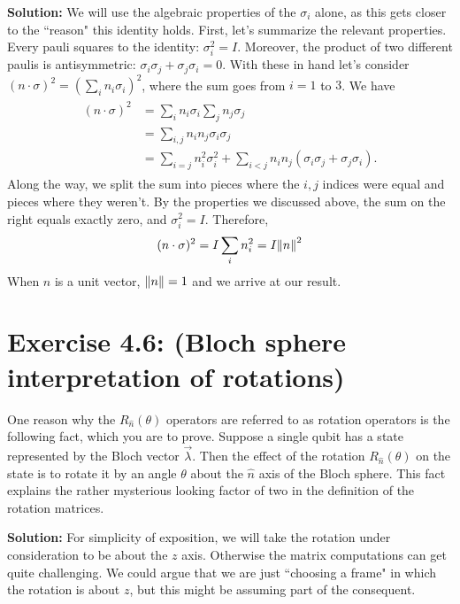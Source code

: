 \documentclass{book}
\begin{document}
    \textbf{Solution:} We will use the algebraic properties of the $\sigma_i$ alone, as this gets closer to the ``reason" this identity holds. First, let's summarize the relevant properties. Every pauli squares to the identity: $\sigma_i^2 = I$. Moreover, the product of two different paulis is antisymmetric: $\sigma_i \sigma_j +\sigma_j \sigma_i = 0$. With these in hand let's consider $(n\cdot \sigma)^2 = (\sum_i n_i \sigma_i)^2$, where the sum goes from $i = 1$ to $3$. We have
    \begin{align}
    \begin{aligned}
        (n\cdot \sigma)^2 &= \sum_i n_i \sigma_i \sum_j n_j  \sigma_j \\
        &= \sum_{i,j} n_i n_j \sigma_i \sigma_j \\
        &= \sum_{i = j} n_i^2 \sigma_i^2 + \sum_{i<j} n_i n_j (\sigma_i \sigma_j + \sigma_j \sigma_i).
    \end{aligned}
    \end{align}
    Along the way, we split the sum into pieces where the $i,j$ indices were equal and pieces where they weren't. By the properties we discussed above, the sum on the right equals exactly zero, and $\sigma_i^2 = I$. Therefore,
    \begin{align}
        (n\cdot \sigma)^2 = I \sum_i n_i^2 = I \norm{n}^2
    \end{align}
    When $n$ is a unit vector, $\norm{n} = 1$ and we arrive at our result.
    
\section*{Exercise 4.6: (Bloch sphere interpretation of rotations)}
    One reason why the $R_{\hat{n}}(\theta)$ operators are referred to as rotation operators is the following fact, which you are to prove. Suppose a single qubit has a state represented by the Bloch vector $\vec{\lambda}$. Then the effect of the rotation $R_{\hat{n}}(\theta)$ on the state is to rotate it by an angle $\theta$ about the $\hat{n}$ axis of the Bloch sphere. This fact explains the rather mysterious looking factor of two in the definition of the rotation matrices.
    
    \textbf{Solution:} For simplicity of exposition, we will take the rotation under consideration to be about the $z$ axis. Otherwise the matrix computations can get quite challenging. We could argue that we are just ``choosing a frame" in which the rotation is about $z$, but this might be assuming part of the consequent. 
    
\end{document}
